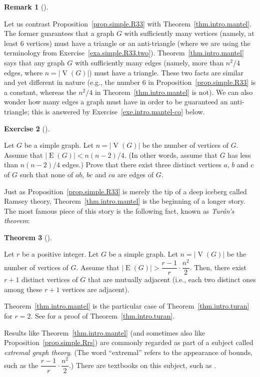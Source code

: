 \documentclass[numbers=enddot,12pt,final,onecolumn,notitlepage]{scrartcl}%
\theoremstyle{definition}
\newtheorem{theo}{Theorem}[subsection]
\newenvironment{theorem}[1][]
{\begin{theo}[#1]\begin{leftbar}}
{\end{leftbar}\end{theo}}
\newtheorem{remk}[theo]{Remark}
\newenvironment{remark}[1][]
{\begin{remk}[#1]\begin{leftbar}}
{\end{leftbar}\end{remk}}
\newtheorem{exmp}[theo]{Exercise}
\newenvironment{exercise}[1][]
{\begin{exmp}[#1]\begin{leftbar}}
{\end{leftbar}\end{exmp}}
\newcommand{\abs}[1]{\left| #1 \right|}
\newcommand{\tup}[1]{\left( #1 \right)}
\newcommand{\verts}[1]{\operatorname{V}\left( #1 \right)}
\newcommand{\edges}[1]{\operatorname{E}\left( #1 \right)}
\begin{document}
\begin{remark}
Let us contrast Proposition~\ref{prop.simple.R33} with
Theorem~\ref{thm.intro.mantel}. The former guarantees that a graph
$G$ with sufficiently many vertices (namely, at least $6$ vertices)
must have a triangle or an anti-triangle (where we are using the
terminology from Exercise~\ref{exa.simple.R33.two}).
Theorem~\ref{thm.intro.mantel} says that any graph $G$ with
sufficiently many edges (namely, more than $n^2 / 4$ edges, where
$n = \abs{\verts{G}}$) must have a triangle. These two facts are
similar and yet different in nature (e.g., the number $6$ in
Proposition~\ref{prop.simple.R33} is a constant, whereas the $n^2 / 4$
in Theorem~\ref{thm.intro.mantel} is not). We can also wonder how many
edges a graph must have in order to be guaranteed an anti-triangle;
this is answered by Exercise~\ref{exe.intro.mantel-co} below.
\end{remark}

\begin{exercise} \label{exe.intro.mantel-co}
Let $G$ be a simple graph. Let $n = \abs{\verts{G}}$ be the number of
vertices of $G$. Assume that $\abs{\edges{G}} < n\tup{n-2} / 4$. (In
other words, assume that $G$ has less than $n\tup{n-2} / 4$ edges.)
Prove that there exist three distinct vertices $a$, $b$ and $c$ of $G$
such that none of $ab$, $bc$ and $ca$ are edges of $G$.
\end{exercise}

Just as Proposition~\ref{prop.simple.R33} is merely the tip of a deep
iceberg called Ramsey theory, Theorem~\ref{thm.intro.mantel} is the
beginning of a longer story. The most famous piece of this story is
the following fact, known as \textit{Tur\'an's theorem}:

\begin{theorem} \label{thm.intro.turan}
Let $r$ be a positive integer.
Let $G$ be a simple graph. Let $n = \abs{\verts{G}}$ be the number of
vertices of $G$. Assume that
$\abs{\edges{G}} > \dfrac{r-1}{r} \cdot \dfrac{n^2}{2}$. Then, there
exist $r + 1$ distinct vertices
of $G$ that are mutually adjacent (i.e., each two distinct ones among
these $r + 1$ vertices are adjacent).
\end{theorem}

Theorem~\ref{thm.intro.mantel} is the particular case of
Theorem~\ref{thm.intro.turan} for $r = 2$. See
\cite[Chapter 4, Theorem 4.8]{Jukna11} for a proof of
Theorem~\ref{thm.intro.turan}.

Results like Theorem~\ref{thm.intro.mantel} (and sometimes also like
Proposition~\ref{prop.simple.Rrs}) are commonly regarded as part of
a subject called \textit{extremal graph theory}. (The word
``extremal'' refers to the appearance of bounds, such as the
$\dfrac{r-1}{r} \cdot \dfrac{n^2}{2}$.) There are textbooks on this
subject, such as \cite{Jukna11}.
\end{document}
